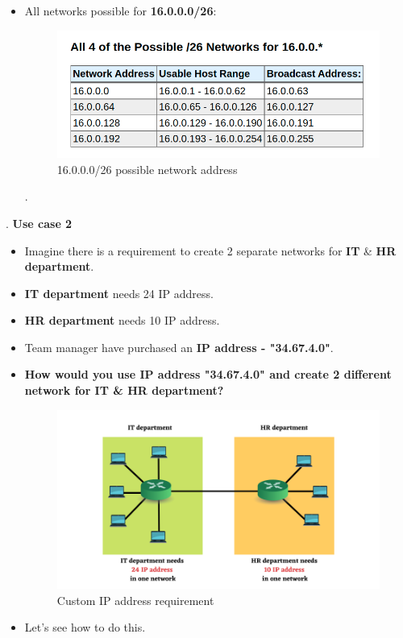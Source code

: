 \begin{flushleft}
\begin{itemize}
\begin{itemize}
		\end{itemize}
		\newpage
		\item All networks possible for \textbf{16.0.0.0/26}:
		\begin{figure}[h!]
			\centering
			\includegraphics[scale=.4]{content/chapter14/images/possible.png}
			\caption{16.0.0.0/26 possible network address}
			\label{fig:cidr_new}
		\end{figure}	
		.
	\end{itemize}
.
\newpage
\newpage
\textbf{Use case 2}
\begin{itemize}
	\item Imagine there is a requirement to create 2 separate networks for \textbf{IT} \& \textbf{HR department}.
	\item \textbf{IT department} needs 24 IP address.
	\item \textbf{HR department} needs 10 IP address.
	\item Team manager have purchased an \textbf{IP address - "34.67.4.0"}.
	\item \textbf{How would you use IP address "34.67.4.0" and create 2 different network for IT \& HR department?}
	\begin{figure}[h!]
		\centering
		\includegraphics[scale=.65]{content/chapter14/images/depart3.png}
		\caption{Custom IP address requirement}
		\label{fig:cidr2}
	\end{figure}	
	\item Let's see how to do this.
\end{itemize}


\end{flushleft}
